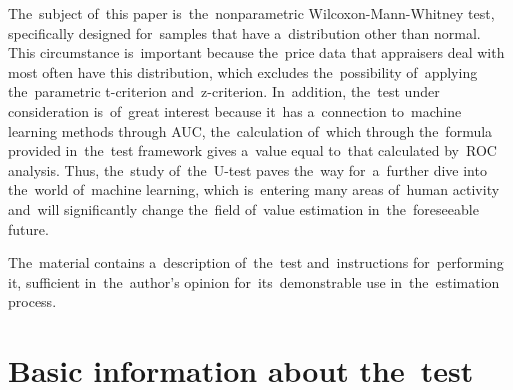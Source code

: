 \documentclass[russian,english]{scrreprt}
\begin{document}
The~subject of~this paper is~the~nonparametric Wilcoxon-Mann-Whitney test, specifically designed for~samples that have a~distribution other than normal. This circumstance is~important because the~price data that appraisers deal with most often have this distribution, which excludes the~possibility of~applying the~parametric t-criterion and~z-criterion. In~addition, the~test under consideration is~of~great interest because it~has a~connection to~machine learning methods through AUC, the~calculation of~which through the~formula provided in~the~test framework gives a~value equal to~that calculated by~ROC analysis. Thus, the~study of~the~U-test paves the~way for~a~further dive into the~world of~machine learning, which is~entering many areas of~human activity and~will significantly change the~field of~value estimation in~the~foreseeable future.

The~material contains a~description of~the~test and~instructions for~performing it, sufficient in~the~author's opinion for~its~demonstrable use in~the~estimation process.
%
\chapter{Basic information about the~test}
\end{document}

